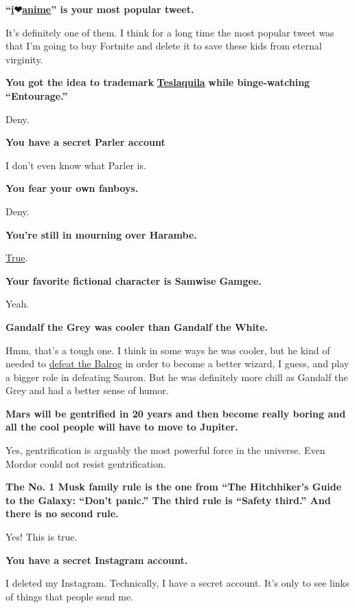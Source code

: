 \textbf{``\href{https://twitter.com/elonmusk/status/1054501056229588992?lang=en}{i}\textbf{❤}\href{https://twitter.com/elonmusk/status/1054501056229588992?lang=en}{anime}''
is your most popular tweet.}

It's definitely one of them. I think for a long time the most popular
tweet was that I'm going to buy Fortnite and delete it to save these
kids from eternal virginity.

\textbf{You got the idea to trademark}
\textbf{\href{https://www.teslarati.com/tesla-teslaquila-elon-musk-booze-release-date-short-shorts/}{Teslaquila}}
\textbf{while binge-watching ``Entourage.''}

Deny.

\textbf{You have a secret Parler account}

I don't even know what Parler is.

\textbf{You fear your own fanboys.}

Deny.

\textbf{You're still in mourning over Harambe.}

\href{https://www.rollingstone.com/music/music-news/elon-musk-rap-song-rip-harambe-815813/}{True}.

\textbf{Your favorite fictional character is Samwise Gamgee.}

Yeah.

\textbf{Gandalf the Grey was cooler than Gandalf the White.}

Hmm, that's a tough one. I think in some ways he was cooler, but he kind
of needed to \href{https://www.youtube.com/watch?v=Y2fwe0rnHak}{defeat
the Balrog} in order to become a better wizard, I guess, and play a
bigger role in defeating Sauron. But he was definitely more chill as
Gandalf the Grey and had a better sense of humor.

\textbf{Mars will be gentrified in 20 years and then become really
boring and all the cool people will have to move to Jupiter.}

Yes, gentrification is arguably the most powerful force in the universe.
Even Mordor could not resist gentrification.

\textbf{The No. 1 Musk family rule is the one from ``The Hitchhiker's
Guide to the Galaxy: ``Don't panic.'' The third rule is ``Safety
third.'' And there is no second rule.}

Yes! This is true.

\textbf{You have a secret Instagram account.}

I deleted my Instagram. Technically, I have a secret account. It's only
to see links of things that people send me.

